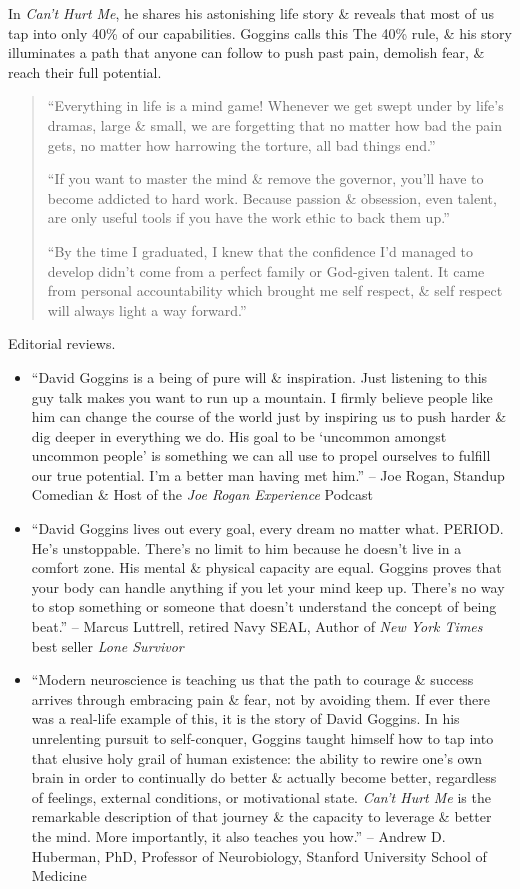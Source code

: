 \documentclass{article}
\begin{document}
\begin{enumerate}
	In {\it Can't Hurt Me}, he shares his astonishing life story \& reveals that most of us tap into only 40\% of our capabilities. {\sc Goggins} calls this The 40\% rule, \& his story illuminates a path that anyone can follow to push past pain, demolish fear, \& reach their full potential.
	\begin{quote}
		\item ``Everything in life is a mind game! Whenever we get swept under by life's dramas, large \& small, we are forgetting that no matter how bad the pain gets, no matter how harrowing the torture, all bad things end.''
		\item ``If you want to master the mind \& remove the governor, you'll have to become addicted to hard work. Because passion \& obsession, even talent, are only useful tools if you have the work ethic to back them up.''
		\item ``By the time I graduated, I knew that the confidence I'd managed to develop didn't come from a perfect family or God-given talent. It came from personal accountability which brought me self respect, \& self respect will always light a way forward.''
	\end{quote}
	{\sf Editorial reviews.}
	\begin{itemize}
		\item ``{\sc David Goggins} is a being of pure will \& inspiration. Just listening to this guy talk makes you want to run up a mountain. I firmly believe people like him can change the course of the world just by inspiring us to push harder \& dig deeper in everything we do. His goal to be `uncommon amongst uncommon people' is something we can all use to propel ourselves to fulfill our true potential. I'm a better man having met him.'' -- {\sc Joe Rogan}, Standup Comedian \& Host of the {\it Joe Rogan Experience} Podcast
		\item ``{\sc David Goggins} lives out every goal, every dream no matter what. PERIOD. He's unstoppable. There's no limit to him because he doesn't live in a comfort zone. His mental \& physical capacity are equal. {\sc Goggins} proves that your body can handle anything if you let your mind keep up. There's no way to stop something or someone that doesn't understand the concept of being beat.'' -- {\sc Marcus Luttrell}, retired Navy SEAL, Author of {\it New York Times} best seller {\it Lone Survivor}
		\item ``Modern neuroscience is teaching us that the path to courage \& success arrives through embracing pain \& fear, not by avoiding them. If ever there was a real-life example of this, it is the story of {\sc David Goggins}. In his unrelenting pursuit to self-conquer, {\sc Goggins} taught himself how to tap into that elusive holy grail of human existence: the ability to rewire one's own brain in order to continually do better \& actually become better, regardless of feelings, external conditions, or motivational state. {\it Can't Hurt Me} is the remarkable description of that journey \& the capacity to leverage \& better the mind. More importantly, it also teaches you how.'' -- {\sc Andrew D. Huberman}, PhD, Professor of Neurobiology, Stanford University School of Medicine

\end{itemize}
\end{enumerate}
\end{document}
